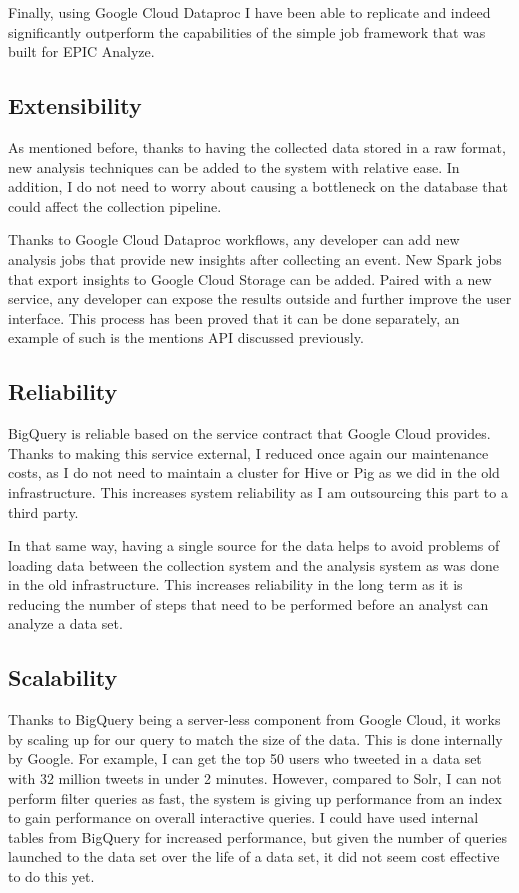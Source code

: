 Finally, using Google Cloud Dataproc I have been able to replicate and indeed significantly outperform the capabilities of the simple job framework that was built for EPIC Analyze.

\subsection{Extensibility}

As mentioned before, thanks to having the collected data stored in a raw format, new analysis techniques can be added to the system with relative ease. In addition, I do not need to worry about causing a bottleneck on the database that could affect the collection pipeline. 

Thanks to Google Cloud Dataproc workflows, any developer can add new analysis jobs that provide new insights after collecting an event. New Spark jobs that export insights to Google Cloud Storage can be added. Paired with a new service, any developer can expose the results outside and further improve the user interface. This process has been proved that it can be done separately, an example of such is the mentions API discussed previously.

\subsection{Reliability}

BigQuery is reliable based on the service contract that Google Cloud provides. Thanks to making this service external, I reduced once again our maintenance costs, as I do not need to maintain a cluster for Hive or Pig as we did in the old infrastructure. This increases  system reliability as I am outsourcing this part to a third party. 

In that same way, having a single source for the data helps to avoid problems of loading data between the collection system and the analysis system as was done in the old infrastructure. This increases reliability in the long term as it is reducing the number of steps that need to be performed before an analyst can analyze a data set. 

\subsection{Scalability}

Thanks to BigQuery being a server-less component from Google Cloud, it works by scaling up for our query to match the size of the data. This is done internally by Google. For example, I can get the top 50 users who tweeted in a data set with 32 million tweets in under 2 minutes. However, compared to Solr, I can not perform filter queries as fast, the system is giving up performance from an index to gain performance on overall interactive queries. I could have used internal tables from BigQuery for increased performance, but given the number of queries launched to the data set over the life of a data set, it did not seem cost effective to do this yet.

